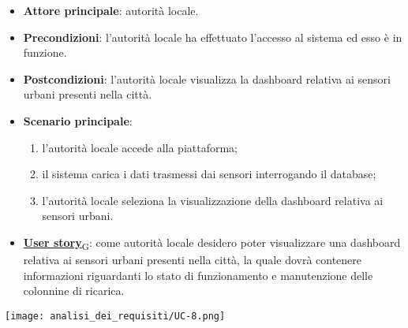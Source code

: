 \begin{itemize}
	\item \textbf{Attore principale}: autorità locale.
	\item \textbf{Precondizioni}: l'autorità locale ha effettuato l'accesso al sistema ed esso è in funzione.
	\item \textbf{Postcondizioni}: l'autorità locale visualizza la dashboard relativa
	      ai sensori urbani presenti nella città.
	\item \textbf{Scenario principale}:
	      \begin{enumerate}
		      \item l'autorità locale accede alla piattaforma;
		      \item il sistema carica i dati trasmessi dai sensori interrogando il database;
		      \item l'autorità locale seleziona la visualizzazione della dashboard relativa ai sensori urbani.
	      \end{enumerate}
	\item \href{https://7last.github.io/docs/pb/documentazione-interna/glossario\#user-story}{\textbf{User story}\textsubscript{G}}:
	      come autorità locale desidero poter visualizzare una dashboard relativa ai sensori urbani presenti nella città, la quale
	      dovrà contenere informazioni riguardanti lo stato di funzionamento e manutenzione delle colonnine di ricarica.
\end{itemize}
\begin{center}
	\texttt{[image: analisi\_dei\_requisiti/UC-8.png]}
\end{center}


